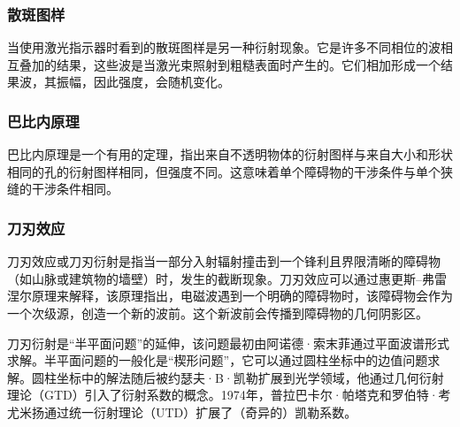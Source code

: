 \subsubsection{散斑图样}  
当使用激光指示器时看到的散斑图样是另一种衍射现象。它是许多不同相位的波相互叠加的结果，这些波是当激光束照射到粗糙表面时产生的。它们相加形成一个结果波，其振幅，因此强度，会随机变化。
\subsubsection{巴比内原理}   
巴比内原理是一个有用的定理，指出来自不透明物体的衍射图样与来自大小和形状相同的孔的衍射图样相同，但强度不同。这意味着单个障碍物的干涉条件与单个狭缝的干涉条件相同。
\subsubsection{刀刃效应} 
刀刃效应或刀刃衍射是指当一部分入射辐射撞击到一个锋利且界限清晰的障碍物（如山脉或建筑物的墙壁）时，发生的截断现象。刀刃效应可以通过惠更斯–弗雷涅尔原理来解释，该原理指出，电磁波遇到一个明确的障碍物时，该障碍物会作为一个次级源，创造一个新的波前。这个新波前会传播到障碍物的几何阴影区。

刀刃衍射是“半平面问题”的延伸，该问题最初由阿诺德·索末菲通过平面波谱形式求解。半平面问题的一般化是“楔形问题”，它可以通过圆柱坐标中的边值问题求解。圆柱坐标中的解法随后被约瑟夫·B·凯勒扩展到光学领域，他通过几何衍射理论（GTD）引入了衍射系数的概念。1974年，普拉巴卡尔·帕塔克和罗伯特·考尤米扬通过统一衍射理论（UTD）扩展了（奇异的）凯勒系数。